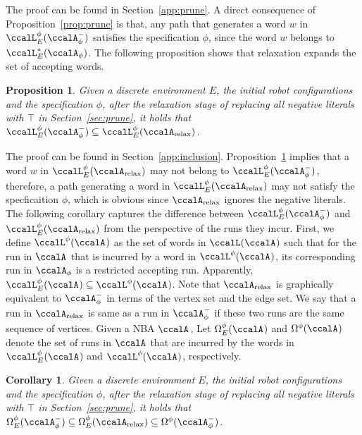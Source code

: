 \documentclass[Afour,sageh,times]{sagej}
\newtheorem{cor}[thm]{Corollary}
\newtheorem{prop}[thm]{Proposition}
\newcommand{\auto}[1]{\ccalA_{\textup{#1}}}
\newcommand{\autop}{\ccalA_{\phi}}
\begin{document}
{  %
    The proof can be found in Section~\ref{app:prune}. A direct consequence of Proposition~\ref{prop:prune} is that, any path that generates a word $w$ in  $\ccalL_E^\phi(\autop^-)$ satisfies the specification $\phi$, since the word $w$ belongs to $\ccalL^*_E(\autop)$. The following proposition shows that relaxation expands the set of accepting words.
  \begin{prop}\label{prop:inclusion}
 Given a discrete environment $E$, the initial robot configurations and the specification $\phi$, after the relaxation stage of replacing all negative literals with $\top$ in Section~\ref{sec:prune}, it holds that $\ccalL^\phi_E(\autop^-) \subseteq \ccalL^\phi_E(\auto{relax})$.
  \end{prop}
  The proof can be found in Section~\ref{app:inclusion}. Proposition~\ref{prop:inclusion} implies that a word $w$ in $\ccalL^\phi_E(\auto{relax})$ may not belong to $\ccalL^\phi_E(\autop^-)$, therefore, a path generating a word in $\ccalL^\phi_E(\auto{relax})$ may not satisfy the specficaition $\phi$, which is obvious since $\auto{relax}$ ignores the negative literals. The following corollary captures the difference between $\ccalL^\phi_E(\autop^-) $ and $\ccalL^\phi_E(\auto{relax})$ from the perspective of the runs they incur. First, we define $\ccalL^\phi(\auto{})$ as the set of  words in $\ccalL(\auto{})$ such that for the run in $\auto{}$ that is incurred by a word in $\ccalL^\phi(\auto{})$, its corresponding run in $\autop$ is a restricted accepting run. Apparently, $\ccalL_E^\phi(\auto{})  \subseteq \ccalL^\phi(\auto{})$.  Note that   $\auto{relax}$ is graphically equivalent to $\autop^-$ in terms of the vertex set and the edge set. We say that a run in $\auto{relax}$ is same as a run in $\autop^-$ if these two runs are the same sequence of vertices. Given a NBA $\auto{}$, Let $\Omega_E^\phi(\auto{})$ and $\Omega^\phi(\auto{})$ denote the set of runs in $\auto{}$ that are incurred by the words in $\ccalL_E^\phi(\auto{})$ and $\ccalL^\phi(\auto{})$, respectively.
    \begin{cor}\label{prop:equality}
Given a discrete environment $E$, the initial robot configurations and the specification $\phi$, after the relaxation stage of replacing all negative literals with $\top$ in Section~\ref{sec:prune}, it holds that $\Omega_E^\phi(\autop^-) \subseteq  \Omega_E^\phi(\auto{relax}) \subseteq \Omega^\phi(\autop^-)$.

\end{cor}}
\end{document}
